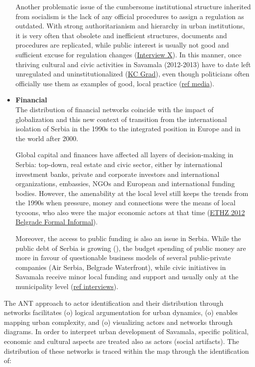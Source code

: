 \documentclass[11pt]{report}
\begin{document}
\begin{itemize}
Another problematic issue of the cumbersome institutional structure inherited from socialism is the lack of any official procedures to assign a regulation as outdated.
With strong authoritarianism and hierarchy in urban institutions, it is very often that obsolete and inefficient structures, documents and procedures are replicated, while public interest is usually not good and sufficient excuse for regulation changes (\href{InterviewX}{Interview X}).
In this manner, once thriving cultural and civic activities in Savamala (2012-2013) have to date left unregulated and uninstitutionalized (\href{ref}{KC Grad}), even though politicians often officially use them as examples of good, local practice (\href{ref}{ref media}).
\\

\item \textbf{Financial}
\\
The distribution of financial networks coincide with the impact of globalization and this new context of transition from the international isolation of Serbia in the 1990s to the integrated position in Europe and in the world after 2000.

Global capital and finances have affected all layers of decision-making in Serbia: top-down, real estate and civic sector, either by international investment banks, private and corporate investors and international organizations, embassies, NGOs and European and international funding bodies.
However, the amenability at the local level still keeps the trends from the 1990s when pressure, money and connections were the means of local tycoons, who also were the major economic actors at that time (\href{ref}{ETHZ 2012 Belgrade Formal Informal}).

Moreover, the access to public funding is also an issue in Serbia.
While the public debt of Serbia is growing (\cite{Table RS}), the budget spending of public money are more in favour of questionable business models of several public-private companies (Air Serbia, Belgrade Waterfront), while civic initiatives in Savamala receive minor local funding and support and usually only at the municipality level (\href{ref}{ref interviews}).
\end{itemize}

The ANT approach to actor identification and their distribution through networks facilitates
(o) logical argumentation for urban dynamics,
(o) enables mapping urban complexity, and
(o) visualizing actors and networks through diagrams.
In order to interpret urban development of Savamala, specific political, economic and cultural aspects are treated also as actors (social artifacts).
The distribution of these networks is traced within the map through the identification of:
\end{document}
